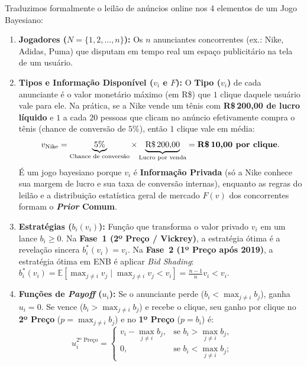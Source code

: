Traduzimos formalmente o leilão de anúncios online nos 4 elementos de um Jogo Bayesiano:
\begin{enumerate}[label=\arabic*.]
    \item \textbf{Jogadores ($N = \{1, 2, \dots, n\}$):} Os $n$ anunciantes concorrentes (ex.: Nike, Adidas, Puma) que disputam em tempo real um espaço publicitário na tela de um usuário.
    \item \textbf{Tipos e Informação Disponível ($v_i$ e $F$):} O \textbf{Tipo ($v_i$)} de cada anunciante é o valor monetário máximo (em R\$) que $1$ clique daquele usuário vale para ele. Na prática, se a Nike vende um tênis com \textbf{R\$\,200,00 de lucro líquido} e $1$ a cada $20$ pessoas que clicam no anúncio efetivamente compra o tênis (chance de conversão de $5\%$), então $1$ clique vale em média:
    \begin{equation}
    v_{\text{Nike}} = \underbrace{5\%}_{\text{Chance de conversão}} \times \underbrace{\text{R\$\,200,00}}_{\text{Lucro por venda}} = \textbf{R\$\,10,00 por clique}.
    \end{equation}
    É um jogo bayesiano porque $v_i$ é \textbf{Informação Privada} (só a Nike conhece sua margem de lucro e sua taxa de conversão internas), enquanto as regras do leilão e a distribuição estatística geral de mercado $F(v)$ dos concorrentes formam o \textbf{\textit{Prior} Comum}.
    \item \textbf{Estratégias ($b_i(v_i)$):} Função que transforma o valor privado $v_i$ em um lance $b_i \ge 0$. Na \textbf{Fase~1 (2º Preço / Vickrey)}, a estratégia ótima é a revelação sincera $b_i^*(v_i) = v_i$. Na \textbf{Fase~2 (1º Preço após 2019)}, a estratégia ótima em ENB é aplicar \textit{Bid Shading}: $b_i^*(v_i) = \mathbb{E}[\max_{j \neq i} v_j \mid \max_{j \neq i} v_j < v_i] = \frac{n-1}{n}v_i < v_i$.
    \item \textbf{Funções de \textit{Payoff} ($u_i$):} Se o anunciante perde ($b_i < \max_{j \neq i} b_j$), ganha $u_i = 0$. Se vence ($b_i > \max_{j \neq i} b_j$) e recebe o clique, seu ganho por clique no \textbf{2º Preço} ($p = \max_{j \neq i} b_j$) e no \textbf{1º Preço} ($p = b_i$) é:
    \begin{equation}
    u_i^{\text{2º Preço}} =
    \begin{cases}
        v_i - \max\limits_{j \neq i} b_j, & \text{se } b_i > \max\limits_{j \neq i} b_j, \\
        0, & \text{se } b_i < \max\limits_{j \neq i} b_j;
    \end{cases}
    \qquad

\end{equation}
\end{enumerate}
